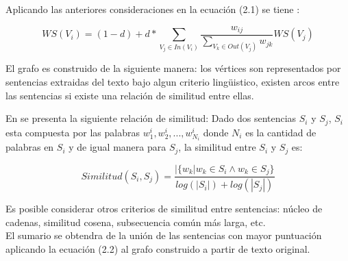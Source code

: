 Aplicando las anteriores consideraciones en la ecuaci\'on (2.1) se tiene
\cite{RMPT04}:

\begin{equation}
	WS(V_i) = (1 - d) + d *
	\sum_{V_j\in In(V_i)}{\frac{w_{ij}}{\sum_{V_k\in Out(V_j)}{w_{jk}}}WS(V_j)}
\end{equation}

El grafo es construido de la siguiente manera: los v\'ertices son representados por
sentencias extraidas del texto bajo algun criterio ling\"uistico, existen arcos
entre las sentencias si existe una relaci\'on de similitud entre ellas.

En \cite{RMPT04} se presenta la siguiente relaci\'on de similitud: Dado dos
sentencias $S_i$ y $S_j$, $S_i$ esta compuesta por las palabras 
$w^i_1,w^i_2,...,w^i_{N_i}$ donde $N_i$ es la cantidad de palabras en $S_i$ y de igual
manera para $S_j$, la similitud entre $S_i$ y $S_j$ es:

\begin{equation}
	Similitud(S_i, S_j) = 
	\frac{|\{w_k|w_k\in S_i \wedge w_k\in S_j\}}{log(|S_i|)+log(|S_j|)}
\end{equation}

Es posible considerar otros criterios de similitud entre sentencias: n\'ucleo de
cadenas, similitud cosena, subsecuencia com\'un m\'as larga, etc. \\

El sumario se obtendra de la uni\'on de las sentencias con mayor puntuaci\'on
aplicando la ecuaci\'on (2.2) al grafo construido a partir de texto original.
